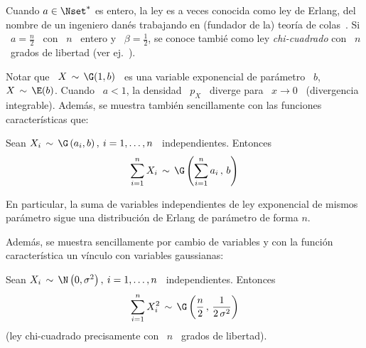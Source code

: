 Cuando $a \in \Nset^*$ es entero, la ley es a veces conocida como ley de Erlang,
del nombre  de un ingeniero dan\'es  trabajando en (fundador de  la) teor\'ia de
colas~\cite{Cox62, Erl09, Erl25, BroHal48}.  Si \  $a = \frac{n}{2}$ \ con \ $n$
\ entero y  \ $\beta = \frac12$, se conoce tambi\'e  como ley {\em chi-cuadrado}
con \ $n$ \ grados de libertad (ver ej.~\cite{JohKot95:v1}).

Notar que \ $X \, \sim \,  \G(1,b)$ \ es una variable exponencial de par\'ametro
\ $b$,  \ie \ $X  \, \sim \,  \E(b)$. Cuando \  $a < 1$,  la densidad \  $p_X$ \
diverge  para \  $x  \to 0$  \  (divergencia integrable).  Adem\'as, se  muestra
tambi\'en sencillamente con las funciones caracter\'isticas que:
%
\begin{lema}[Stabilidad]
\label{Lem:MP:StabilidadGamma}
%
  Sean $X_i  \, \sim  \, \G\left( a_i  , b  \right), \: i  = 1 ,  \ldots ,  n$ \
  independientes. Entonces
  \[
  \sum_{i=1}^n X_i \, \sim \, \G\left( \sum_{i=1}^n a_i \, , \, b \right)
  \]
\end{lema}
%
En particular, la suma de  variables independientes de ley exponencial de mismos
par\'ametro sigue una distribuci\'on de Erlang de par\'ametro de forma $n$.

Adem\'as, se  muestra sencillamente por cambio  de variables y  con la funci\'on
caracter\'istica un v\'inculo con variables gaussianas:
%
\begin{lema}
\label{Lem:MP:VinculoGammaGaussiana}
%
  Sean $X_i \, \sim \,  \N\left( 0 , \sigma^2 \right), \: i = 1  , \ldots , n$ \
  independientes. Entonces
  \[
  \sum_{i=1}^n  X_i^2 \,  \sim \,  \G\left( \frac{n}{2}  \, ,  \,  \frac{1}{2 \,
      \sigma^2} \right)
  \]
  (ley chi-cuadrado precisamente con \ $n$ \ grados de libertad).
\end{lema}

